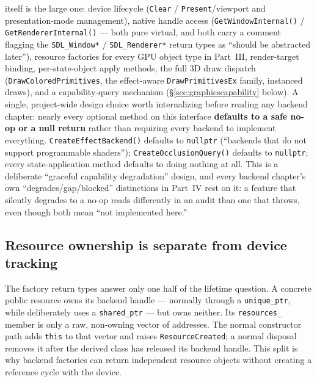  itself is the large one: device lifecycle
(\texttt{Clear} / \texttt{Present}/viewport and presentation-mode management), native handle
access (\texttt{GetWindowInternal()} / \texttt{GetRendererInternal()} --- both pure virtual,
and both carry a comment flagging the \texttt{SDL\_Window*} / \texttt{SDL\_Renderer*} return
types as ``should be abstracted later''), resource factories for every GPU object type in
Part~III, render-target binding, per-state-object apply methods, the full 3D draw dispatch
(\texttt{DrawColoredPrimitives}, the effect-aware \texttt{DrawPrimitivesEx} family, instanced
draws), and a capability-query mechanism (\S\ref{sec:graphicscapability} below). A single,
project-wide design choice worth internalizing before reading any backend chapter: nearly
every optional method on this interface \textbf{defaults to a safe no-op or a null return}
rather than requiring every backend to implement everything. \texttt{CreateEffectBackend()}
defaults to \texttt{nullptr} (``backends that do not support programmable shaders'');
\texttt{CreateOcclusionQuery()} defaults to \texttt{nullptr}; every state-application method
defaults to doing nothing at all. This is a deliberate ``graceful capability degradation''
design, and every backend chapter's own ``degrades/gap/blocked'' distinctions in Part~IV rest on it: a feature
that silently degrades to a no-op reads differently in an audit than one that throws, even
though both mean ``not implemented here.''

\subsection{Resource ownership is separate from device tracking}
\label{sec:backend-resource-tracking}

The factory return types answer only one half of the lifetime question. A concrete public
resource owns its backend handle --- normally through a \texttt{unique\_ptr}, while
 deliberately uses a \texttt{shared\_ptr} --- but
 owns neither. Its \texttt{resources\_} member is only a raw,
non-owning vector of  addresses. The normal constructor path adds
\texttt{this} to that vector and raises \texttt{ResourceCreated}; a normal disposal removes it
after the derived class has released its backend handle. This split is why backend factories can
return independent resource objects without creating a reference cycle with the device.

